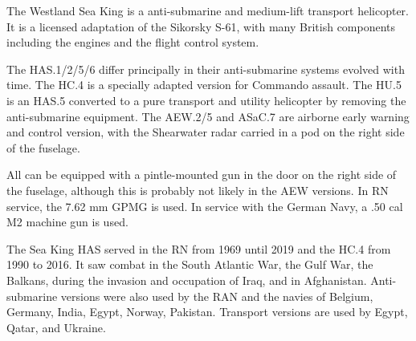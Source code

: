 

The Westland Sea King is a anti-submarine and medium-lift transport helicopter. It is a licensed adaptation of the Sikorsky S-61, with many British components including the engines and the flight control system.

The HAS.1/2/5/6 differ principally in their anti-submarine systems evolved with time. The HC.4 is a specially adapted version for Commando assault. The HU.5 is an HAS.5 converted to a pure transport and utility helicopter by removing the anti-submarine equipment. The AEW.2/5 and ASaC.7 are airborne early warning and control version, with the Shearwater radar carried in a pod on the right side of the fuselage.

All can be equipped with a pintle-mounted gun in the door on the right side of the fuselage, although this is probably not likely in the AEW versions. In RN service, the 7.62 mm GPMG is used. In service with the German Navy, a .50 cal M2 machine gun is used.

The Sea King HAS served in the RN from 1969 until 2019 and the HC.4 from 1990 to 2016. It saw combat in the South Atlantic War, the Gulf War, the Balkans, during the invasion and occupation of Iraq, and in Afghanistan. Anti-submarine versions were also used by the RAN and the navies of Belgium, Germany, India, Egypt, Norway, Pakistan. Transport versions are used by Egypt, Qatar, and Ukraine.